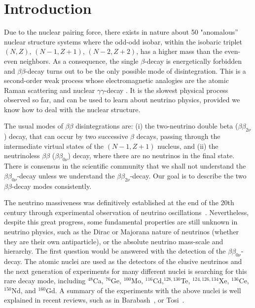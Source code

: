 \documentclass[nofootinbib,twocolumn,eqsecnum,floats,aps]{revtex4}
\begin{document}

\maketitle
%
\section {Introduction}\label{Sec1}
%

Due to the nuclear pairing force, there exists in nature
about 50  "anomalous''
nuclear structure systems   where   the
odd-odd isobar, within the isobaric triplet $(N, Z)$,  $(N-1,
Z+1)$, $(N-2, Z+2)$,  has  a higher mass than the even-even
neighbors. As a consequence, the single $\beta$-decay is energetically forbidden
and   $\beta \beta$-decay turns out
to be the only possible mode of disintegration.
This is a second-order weak process whose electromagnetic analogies
are the atomic Raman scattering and  nuclear $\gamma \gamma$-decay \cite{Kra87}.
It is the slowest physical process observed so far,
and  can be used to learn about  neutrino physics,
provided we know how to deal with the nuclear structure.


The usual modes of $\beta \beta$ disintegrations are: (i) the
two-neutrino double beta ($\beta\beta_{2\nu}$) decay, that can
occur by two successive $\beta$ decays, passing through the
intermediate virtual states of the $(N-1, Z+1)$ nucleus, and (ii)
the neutrinoless $\beta \beta$ ($\beta\beta_{0\nu}$) decay, where
there are no neutrinos in the final state. There is consensus in
the scientific community  that we shall not understand the
$\beta\beta_{0\nu}$-decay unless we understand the
$\beta\beta_{2\nu}$-decay. Our goal is to describe the two
$\beta\beta$-decay modes consistently.

The neutrino  massiveness was definitively established  at
the end of the 20th century through  experimental observation  of
neutrino oscillations~\cite{Fuk98}. Nevertheless,  despite this
great progress, some fundamental properties are still unknown  in
neutrino physics, such as the Dirac or Majorana  nature of
neutrinos (whether they are their own antiparticle), or the
absolute neutrino mass-scale and hierarchy.
The first question
would be answered with the detection of the
$\beta\beta_{0\nu}$-decay. The atomic nuclei are used as the detectors of
the elusive neutrinos and the next generation of experiments for
many different nuclei is searching for this rare decay mode,
including $^{48}$Ca, $^{76}$Ge, $^{100}$Mo, $^{116}$Cd,$
^{128,130}$Te, $^{124, 126, 134}$Xe, $^{136}$Ce, $^{150}$Nd, and
$^{160}$Gd. A summary of the experiments with the above nuclei is
well explained in recent reviews,  such as in
Barabash~\cite{Bar15}, or Tosi~\cite{Tosi14}.
\end{document}
